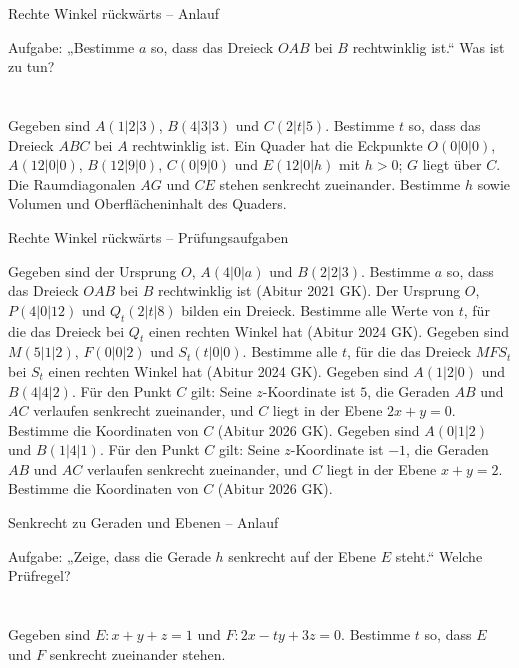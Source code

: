 \begin{aufgabe}{Rechte Winkel rückwärts – Anlauf}
\begin{teile}
\teil Aufgabe: „Bestimme $a$ so, dass das Dreieck $OAB$ bei $B$ rechtwinklig ist.“ Was ist zu tun? \\  \\  \\ 
\teil Gegeben sind $A(1 | 2 | 3)$, $B(4 | 3 | 3)$ und $C(2 | t | 5)$. Bestimme $t$ so, dass das Dreieck $ABC$ bei $A$ rechtwinklig ist.
\teil Ein Quader hat die Eckpunkte $O(0 | 0 | 0)$, $A(12 | 0 | 0)$, $B(12 | 9 | 0)$, $C(0 | 9 | 0)$ und $E(12 | 0 | h)$ mit $h > 0$; $G$ liegt über $C$. Die Raumdiagonalen $AG$ und $CE$ stehen senkrecht zueinander. Bestimme $h$ sowie Volumen und Oberflächeninhalt des Quaders.
\end{teile}
\end{aufgabe}

\begin{aufgabe}{Rechte Winkel rückwärts – Prüfungsaufgaben}
\begin{teile}
\teil Gegeben sind der Ursprung $O$, $A(4 | 0 | a)$ und $B(2 | 2 | 3)$. Bestimme $a$ so, dass das Dreieck $OAB$ bei $B$ rechtwinklig ist \hfill (Abitur 2021 GK).
\teil Der Ursprung $O$, $P(4 | 0 | 12)$ und $Q_t(2 | t | 8)$ bilden ein Dreieck. Bestimme alle Werte von $t$, für die das Dreieck bei $Q_t$ einen rechten Winkel hat \hfill (Abitur 2024 GK).
\teil Gegeben sind $M(5 | 1 | 2)$, $F(0 | 0 | 2)$ und $S_t(t | 0 | 0)$. Bestimme alle $t$, für die das Dreieck $MFS_t$ bei $S_t$ einen rechten Winkel hat \hfill (Abitur 2024 GK).
\teil Gegeben sind $A(1 | 2 | 0)$ und $B(4 | 4 | 2)$. Für den Punkt $C$ gilt: Seine $z$-Koordinate ist $5$, die Geraden $AB$ und $AC$ verlaufen senkrecht zueinander, und $C$ liegt in der Ebene $2x + y = 0$. Bestimme die Koordinaten von $C$ \hfill (Abitur 2026 GK).
\teil Gegeben sind $A(0 | 1 | 2)$ und $B(1 | 4 | 1)$. Für den Punkt $C$ gilt: Seine $z$-Koordinate ist $-1$, die Geraden $AB$ und $AC$ verlaufen senkrecht zueinander, und $C$ liegt in der Ebene $x + y = 2$. Bestimme die Koordinaten von $C$ \hfill (Abitur 2026 GK).
\end{teile}
\end{aufgabe}

\begin{aufgabe}{Senkrecht zu Geraden und Ebenen – Anlauf}
\begin{teile}
\teil Aufgabe: „Zeige, dass die Gerade $h$ senkrecht auf der Ebene $E$ steht.“ Welche Prüfregel? \\  \\  \\ 
\teil Gegeben sind $E\colon x + y + z = 1$ und $F\colon 2x - ty + 3z = 0$. Bestimme $t$ so, dass $E$ und $F$ senkrecht zueinander stehen.
\end{teile}
\end{aufgabe}

